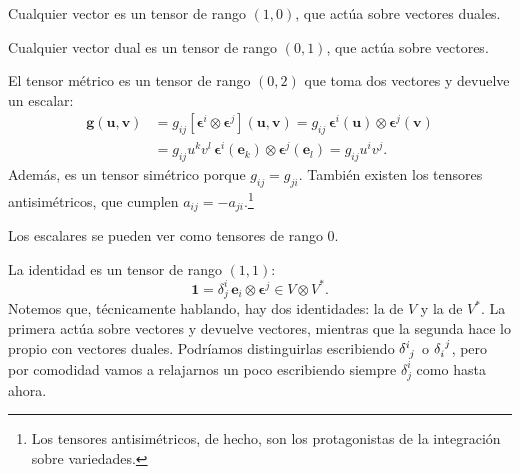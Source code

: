 \begin{myitemize}
    \item Cualquier vector es un tensor de rango \((1, 0)\), que actúa sobre vectores duales.
    \item Cualquier vector dual es un tensor de rango \((0, 1)\), que actúa sobre vectores.
    \item El tensor métrico es un tensor de rango \((0, 2)\) que toma dos vectores y devuelve un escalar:
    \begin{align}
        \nonumber
        \mathbf{g}(\mathbf{u},\mathbf{v}) &= g_{ij}[\boldsymbol{\epsilon}^i\otimes\boldsymbol{\epsilon}^j](\mathbf{u},\mathbf{v}) = g_{ij}\,\boldsymbol{\epsilon}^i(\mathbf{u})\otimes\boldsymbol{\epsilon}^j(\mathbf{v})\\
        &= g_{ij}u^k v^l\,\boldsymbol{\epsilon}^i(\mathbf{e}_k)\otimes\boldsymbol{\epsilon}^j(\mathbf{e}_l) = g_{ij}u^i v^j.
    \end{align}
    Además, es un tensor simétrico porque \(g_{ij}=g_{ji}\). También existen los tensores antisimétricos, que cumplen \(a_{ij} = -a_{ji}\).\footnote{Los tensores antisimétricos, de hecho, son los protagonistas de la integración sobre variedades.}
    \item Los escalares se pueden ver como tensores de rango 0.
    \item La identidad es un tensor de rango \((1, 1)\): \begin{equation}
        \label{eq.2identity}
        \mathbf{1} = \delta^i_j\, \mathbf{e}_i\otimes\boldsymbol{\epsilon}^j \in V\otimes V^*.
    \end{equation}
    Notemos que, técnicamente hablando, hay dos identidades: la de \(V\) y la de \(V^*\). La primera actúa sobre vectores y devuelve vectores, mientras que la segunda hace lo propio con vectores duales. Podríamos distinguirlas escribiendo \(\tensor{\delta}{^i_j}\) o \(\tensor{\delta}{_i^j}\), pero por comodidad vamos a relajarnos un poco escribiendo siempre \(\delta^i_j\) como hasta ahora.      
\end{myitemize}

